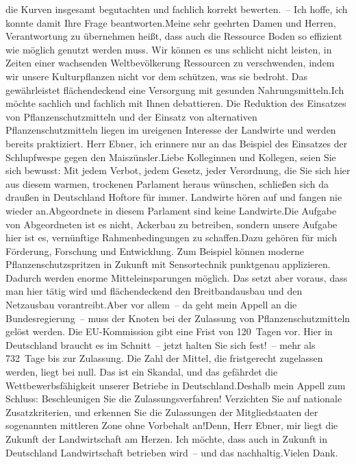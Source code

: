 \documentclass{article}
\begin{document}
die Kurven insgesamt begutachten und fachlich korrekt bewerten. – Ich hoffe, ich konnte damit Ihre Frage beantworten.Meine sehr geehrten Damen und Herren, Verantwortung zu übernehmen heißt, dass auch die Ressource Boden so effizient wie möglich genutzt werden muss. Wir können es uns schlicht nicht leisten, in Zeiten einer wachsenden Weltbevölkerung Ressourcen zu verschwenden, indem wir unsere Kulturpflanzen nicht vor dem schützen, was sie bedroht. Das gewährleistet flächendeckend eine Versorgung mit gesunden Nahrungsmitteln.Ich möchte sachlich und fachlich mit Ihnen debattieren. Die Reduktion des Einsatzes von Pflanzenschutzmitteln und der Einsatz von alternativen Pflanzenschutzmitteln liegen im ureigenen Interesse der Landwirte und werden bereits praktiziert. Herr Ebner, ich erinnere nur an das Beispiel des Einsatzes der Schlupfwespe gegen den Maiszünsler.Liebe Kolleginnen und Kollegen, seien Sie sich bewusst: Mit jedem Verbot, jedem Gesetz, jeder Verordnung, die Sie sich hier aus diesem warmen, trockenen Parlament heraus wünschen, schließen sich da draußen in Deutschland Hoftore für immer. Landwirte hören auf und fangen nie wieder an.Abgeordnete in diesem Parlament sind keine Landwirte.Die Aufgabe von Abgeordneten ist es nicht, Ackerbau zu betreiben, sondern unsere Aufgabe hier ist es, vernünftige Rahmenbedingungen zu schaffen.Dazu gehören für mich Förderung, Forschung und Entwicklung. Zum Beispiel können moderne Pflanzenschutzspritzen in Zukunft mit Sensortechnik punktgenau applizieren. Dadurch werden enorme Mitteleinsparungen möglich. Das setzt aber voraus, dass man hier tätig wird und flächendeckend den Breitbandausbau und den Netzausbau vorantreibt.Aber vor allem – da geht mein Appell an die Bundesregierung – muss der Knoten bei der Zulassung von Pflanzenschutzmitteln gelöst werden. Die EU-Kommission gibt eine Frist von 120 Tagen vor. Hier in Deutschland braucht es im Schnitt – jetzt halten Sie sich fest! – mehr als 732 Tage bis zur Zulassung. Die Zahl der Mittel, die fristgerecht zugelassen werden, liegt bei null. Das ist ein Skandal, und das gefährdet die Wettbewerbsfähigkeit unserer Betriebe in Deutschland.Deshalb mein Appell zum Schluss: Beschleunigen Sie die Zulassungsverfahren! Verzichten Sie auf nationale Zusatzkriterien, und erkennen Sie die Zulassungen der Mitgliedstaaten der sogenannten mittleren Zone ohne Vorbehalt an!Denn, Herr Ebner, mir liegt die Zukunft der Landwirtschaft am Herzen. Ich möchte, dass auch in Zukunft in Deutschland Landwirtschaft betrieben wird – und das nachhaltig.Vielen Dank.
\end{document}
